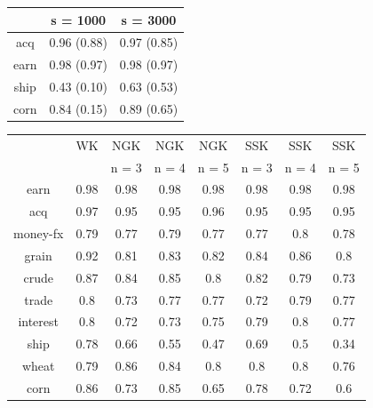 \begin{tabular}{ c | c | c | }
	& s = 1000 & s = 3000   \\ \hline
	acq & 0.96 (0.88)& 0.97 (0.85)\\ \hline
	earn & 0.98 (0.97) & 0.98  (0.97) \\ \hline
	ship & 0.43 (0.10) & 0.63  (0.53) \\ \hline
	corn & 0.84 (0.15) & 0.89 (0.65) \\ \hline
\end{tabular}



\begin{tabular}{ c | c | c | c | c | c | c | c |}
	& WK & NGK & NGK  & NGK  & SSK & SSK& SSK \\ 
	&  & n = 3& n = 4 & n = 5 & n = 3& n = 4 & n = 5 \\ \hline
	earn & 0.98 & 0.98 &  0.98&  0.98 & 0.98 & 0.98 & 0.98 \\ \hline
	acq & 0.97 & 0.95 &  0.95 &  0.96 & 0.95 & 0.95 & 0.95 \\ \hline
	money-fx & 0.79 & 0.77 &  0.79 & 0.77 & 0.77 & 0.8 & 0.78 \\ \hline
	grain & 0.92 & 0.81 &  0.83& 0.82 & 0.84 & 0.86 & 0.8 \\ \hline
	crude & 0.87 & 0.84 &  0.85 & 0.8 & 0.82 & 0.79 & 0.73 \\ \hline
	trade & 0.8 & 0.73 &  0.77 & 0.77 & 0.72 & 0.79 & 0.77 \\ \hline
	interest & 0.8 & 0.72 &  0.73 & 0.75 & 0.79 & 0.8 & 0.77 \\ \hline
	ship & 0.78 & 0.66 &  0.55 & 0.47 & 0.69 & 0.5 & 0.34 \\ \hline
	wheat & 0.79 & 0.86 &  0.84 & 0.8 & 0.8 & 0.8 & 0.76 \\ \hline
	corn & 0.86 & 0.73 &  0.85 & 0.65 & 0.78 & 0.72 & 0.6 \\ \hline	
\end{tabular}